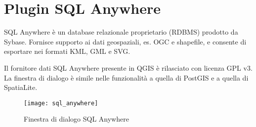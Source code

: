 
\section{ Plugin SQL Anywhere}\label{sec:sqlanywhere}


SQL Anywhere è un database relazionale proprietario (RDBMS) prodotto da Sybase. 
Fornisce supporto ai dati geospaziali, es. OGC e shapefile, e consente di esportare 
nei formati KML, GML e SVG.

Il fornitore dati SQL Anywhere  
presente in QGIS è rilasciato con licenza GPL v3. 
La finestra di dialogo  è simile nelle funzionalità a quella di PostGIS 
e a quella di SpatiaLite.

\begin{figure}[ht]
   \centering
   \texttt{[image: sql\_anywhere]}
   \caption{Finestra di dialogo SQL Anywhere \wincaption}
   \label{fig:sqlanywhere}
\end{figure}


\FloatBarrier
